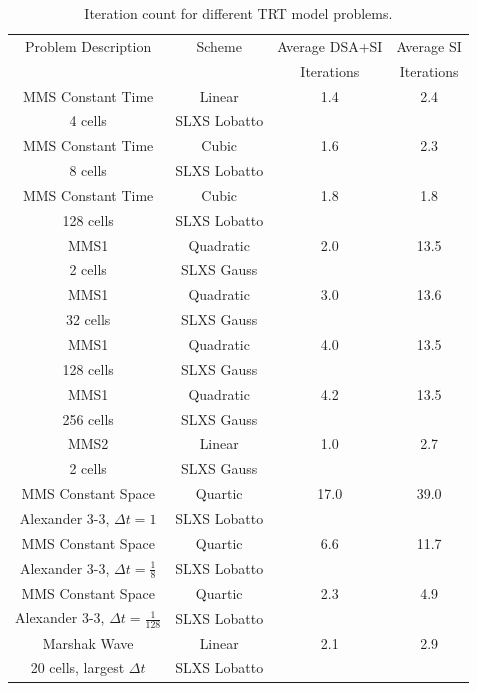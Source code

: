 \begin{table}[!htp]
\centering
\caption{Iteration count for different TRT model problems.}
\begin{tabular}{|c|c|c|c|}
\hline
Problem Description & Scheme & Average DSA+SI & Average SI \\
{}									&				 &  Iterations & Iterations  \\
\hline
MMS Constant Time & Linear  & 1.4 & 2.4 \\
4 cells 					& SLXS Lobatto & {} & {} \\
\hline
MMS Constant Time	 & Cubic 			 & 1.6 & 2.3 \\
8 cells 						& SLXS Lobatto & {} & {} \\
\hline
MMS Constant Time	 & Cubic 				 & 1.8 & 1.8 \\
128 cells 					& SLXS Lobatto & {} & {} \\
\hline
MMS1 						& Quadratic 		& 2.0 & 13.5 \\
2 cells 				& SLXS Gauss 		& {}  & {} \\
\hline
MMS1 						& Quadratic 	& 3.0 & 13.6 \\
32 cells 				& SLXS Gauss 	& {} & {} \\
\hline
MMS1	 				& Quadratic  & 4.0 & 13.5 \\
128 cells 		& SLXS Gauss & {} & {} \\
\hline
MMS1 					& Quadratic		& 4.2 & 13.5 \\
256 cells 		& SLXS Gauss 	& {} & {} \\
\hline
MMS2 						& Linear	 & 1.0 & 2.7 \\
2 cells 					& SLXS Gauss & {} & {} \\
\hline
MMS Constant Space 									& Quartic 				 & 17.0 & 39.0 \\
Alexander 3-3, $\Delta t=1$					& SLXS Lobatto 			& {}  & {} \\
\hline
MMS Constant Space 										& Quartic 				 & 6.6 & 11.7 \\
Alexander 3-3, $\Delta t=\frac{1}{8}$	& SLXS Lobatto 			& {}  & {} \\
\hline
MMS Constant Space 										& Quartic 				 & 2.3 & 4.9 \\
Alexander 3-3, $\Delta t=\frac{1}{128}$	& SLXS Lobatto 			& {}  & {} \\
\hline
Marshak Wave 									&  Linear			 & 2.1 & 2.9 \\
20 cells, largest $\Delta t$	& SLXS Lobatto & {} 		 & {} \\
\hline
\end{tabular}
\label{tbl:iteration_count}
\end{table}

